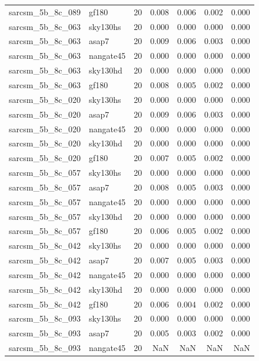 \begin{tabular}{llrrrrr}
sarcsm\_5b\_8c\_089 & gf180 & 20 & 0.008 & 0.006 & 0.002 & 0.000 \\
sarcsm\_5b\_8c\_063 & sky130hs & 20 & 0.000 & 0.000 & 0.000 & 0.000 \\
sarcsm\_5b\_8c\_063 & asap7 & 20 & 0.009 & 0.006 & 0.003 & 0.000 \\
sarcsm\_5b\_8c\_063 & nangate45 & 20 & 0.000 & 0.000 & 0.000 & 0.000 \\
sarcsm\_5b\_8c\_063 & sky130hd & 20 & 0.000 & 0.000 & 0.000 & 0.000 \\
sarcsm\_5b\_8c\_063 & gf180 & 20 & 0.008 & 0.005 & 0.002 & 0.000 \\
sarcsm\_5b\_8c\_020 & sky130hs & 20 & 0.000 & 0.000 & 0.000 & 0.000 \\
sarcsm\_5b\_8c\_020 & asap7 & 20 & 0.009 & 0.006 & 0.003 & 0.000 \\
sarcsm\_5b\_8c\_020 & nangate45 & 20 & 0.000 & 0.000 & 0.000 & 0.000 \\
sarcsm\_5b\_8c\_020 & sky130hd & 20 & 0.000 & 0.000 & 0.000 & 0.000 \\
sarcsm\_5b\_8c\_020 & gf180 & 20 & 0.007 & 0.005 & 0.002 & 0.000 \\
sarcsm\_5b\_8c\_057 & sky130hs & 20 & 0.000 & 0.000 & 0.000 & 0.000 \\
sarcsm\_5b\_8c\_057 & asap7 & 20 & 0.008 & 0.005 & 0.003 & 0.000 \\
sarcsm\_5b\_8c\_057 & nangate45 & 20 & 0.000 & 0.000 & 0.000 & 0.000 \\
sarcsm\_5b\_8c\_057 & sky130hd & 20 & 0.000 & 0.000 & 0.000 & 0.000 \\
sarcsm\_5b\_8c\_057 & gf180 & 20 & 0.006 & 0.005 & 0.002 & 0.000 \\
sarcsm\_5b\_8c\_042 & sky130hs & 20 & 0.000 & 0.000 & 0.000 & 0.000 \\
sarcsm\_5b\_8c\_042 & asap7 & 20 & 0.007 & 0.005 & 0.003 & 0.000 \\
sarcsm\_5b\_8c\_042 & nangate45 & 20 & 0.000 & 0.000 & 0.000 & 0.000 \\
sarcsm\_5b\_8c\_042 & sky130hd & 20 & 0.000 & 0.000 & 0.000 & 0.000 \\
sarcsm\_5b\_8c\_042 & gf180 & 20 & 0.006 & 0.004 & 0.002 & 0.000 \\
sarcsm\_5b\_8c\_093 & sky130hs & 20 & 0.000 & 0.000 & 0.000 & 0.000 \\
sarcsm\_5b\_8c\_093 & asap7 & 20 & 0.005 & 0.003 & 0.002 & 0.000 \\
sarcsm\_5b\_8c\_093 & nangate45 & 20 & NaN & NaN & NaN & NaN \\

\end{tabular}
